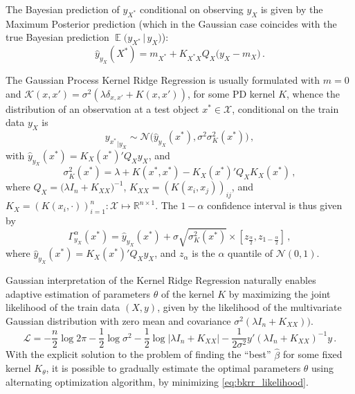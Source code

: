 \documentclass{ITaSconf}
\newcommand{\ex}{\mathop{\mathbb{E}}\nolimits}
\newcommand{\Ncal}{\mathcal{N}}
\newcommand{\Kcal}{\mathcal{K}}
\newcommand{\Xcal}{\mathcal{X}}
\newcommand{\Real}{\mathbb{R}}
\newcommand{\Lcal}{\mathcal{L}}
\begin{document}
The Bayesian prediction of $y_{X^*}$ conditional on observing $y_X$ is given by
the Maximum Posterior prediction (which in the Gaussian case coincides with the
true Bayesian prediction $\ex\bigl(y_{X^*}\,|\, y_X\bigr)$):
\begin{equation*}
  \hat{y}_{y_X}(X^*) = m_{X^*} + K_{X^*X} Q_X \bigl(y_X - m_X\bigr) \,.
\end{equation*}

The Gaussian Process Kernel Ridge Regression is usually formulated with $m=0$ and
$\Kcal(x,x') = \sigma^2(\lambda \delta_{x,x'} + K(x,x'))$, for some PD kernel $K$,
whence the distribution of an observation at a test object $x^*\in \Xcal$, conditional
on the train data $y_X$ is
\begin{equation} \label{eq:gp_cond_dist}
{y_{x^*}}_{|y_X}
  \sim \Ncal\bigl( \hat{y}_{y_X}(x^*), \sigma^2 \sigma_K^2(x^*) \bigr) \,,
\end{equation}
with $\hat{y}_{y_X}(x^*) = K_X(x^*)' Q_X y_X$, and
\begin{equation*}
  \sigma_K^2(x^*)
    = \lambda + K(x^*, x^*) - K_X(x^*)' Q_X K_X(x^*) \,,
\end{equation*}
where $Q_X = \bigl(\lambda I_n + K_{XX}\bigr)^{-1}$, $K_{XX} = (K(x_i,x_j))_{ij}$,
and $K_X = (K(x_i, \cdot))_{i=1}^n: \Xcal \mapsto \Real^{n\times1}$. The $1-\alpha$
confidence interval is thus given by
\begin{equation} \label{eq:gp_conf_int}
\Gamma^\alpha_{y_X}(x^*)
  = \hat{y}_{y_X}(x^*)
  + \sigma \sqrt{\sigma_K^2(x^*)}
  \times [z_{\frac{\alpha}{2}}, z_{1-\frac{\alpha}{2}}]
  \,,
\end{equation}
where $\hat{y}_{y_X}(x^*) = K_X(x^*)' Q_X y_X$, and $z_\alpha$ is the $\alpha$
quantile of $\Ncal(0, 1)$.

Gaussian interpretation of the Kernel Ridge Regression naturally enables adaptive
estimation of parameters $\theta$ of the kernel $K$ by maximizing the joint likelihood
of the train data $(X, y)$, given by the likelihood of the multivariate Gaussian
distribution with zero mean and covariance $\sigma^2 (\lambda I_n + K_{XX}))$.
\begin{equation} \label{eq:bkrr_likelihood}
  \Lcal
    = -\frac{n}{2}\log 2\pi
    - \frac{1}{2}\log \sigma^2
    - \frac{1}{2}\log \lvert \lambda I_n + K_{XX} \rvert
    - \frac{1}{2\sigma^2} y' (\lambda I_n + K_{XX})^{-1} y
    \,.
\end{equation}
With the explicit solution to the problem of finding the ``best'' $\hat{\beta}$ for
some fixed kernel $K_\theta$, it is possible to gradually estimate the optimal parameters
$\theta$ using alternating optimization algorithm, by minimizing \ref{eq:bkrr_likelihood}.
\end{document}
